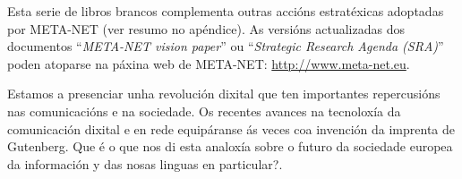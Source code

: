 \begin{multicols}{2}
Esta serie de libros brancos complementa outras accións estratéxicas adoptadas por META-NET (ver resumo no apéndice). As versións actualizadas dos documentos “\textit{META-NET vision paper}” \cite{Meta1} ou “\textit{Strategic Research Agenda (SRA)}” poden atoparse na páxina web de META-NET: \url{http://www.meta-net.eu}.
\end{multicols}

\clearpage



\begin{multicols}{2}

 Estamos a presenciar  unha revolución dixital que ten importantes repercusións nas comunicacións e na sociedade. Os recentes avances na tecnoloxía da comunicación dixital e en rede equipáranse ás veces coa invención da imprenta de Gutenberg.  Que é o que nos di esta analoxía sobre o futuro da sociedade europea da información y das nosas linguas en particular?.





\end{multicols}
